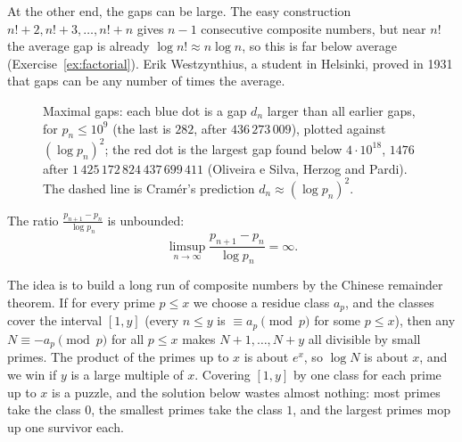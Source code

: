 At the other end, the gaps can be large. The easy construction $n!+2,n!+3,\dots,n!+n$ gives $n-1$ consecutive composite numbers, but near
$n!$ the average gap is already $\log n!\approx n\log n$, so this is far below average (Exercise~\ref{ex:factorial}). Erik Westzynthius, a student in
Helsinki, proved in 1931 that gaps can be any number of times the average.

\begin{figure}[ht]
\centering
{}
\caption{Maximal gaps: each blue dot is a gap $d_n$ larger than all earlier gaps, for $p_n\le10^9$ (the last is $282$, after $436\,273\,009$), plotted
against $(\log p_n)^2$; the red dot is the largest gap found below $4\cdot10^{18}$, $1476$ after $1\,425\,172\,824\,437\,699\,411$ (Oliveira e Silva, Herzog
and Pardi). The dashed line is Cram\'er's prediction $d_n\approx(\log p_n)^2$.}
\label{fig:gaps}
\end{figure}

\begin{theorem}[Westzynthius, 1931]\label{thm:westzynthius}
The ratio $\frac{p_{n+1}-p_n}{\log p_n}$ is unbounded:
\[
\limsup_{n\to\infty}\frac{p_{n+1}-p_n}{\log p_n}=\infty.
\]
\end{theorem}

The idea is to build a long run of composite numbers by the Chinese remainder theorem. If for every prime $p\le x$ we choose a residue class $a_p$,
and the classes cover the interval $[1,y]$ (every $n\le y$ is $\equiv a_p\pmod p$ for some $p\le x$), then any $N\equiv-a_p\pmod p$ for all $p\le x$ makes
$N+1,\dots,N+y$ all divisible by small primes. The product of the primes up to $x$ is about $e^x$, so $\log N$ is about $x$, and we win if $y$ is a large
multiple of $x$. Covering $[1,y]$ by one class for each prime up to $x$ is a puzzle, and the solution below wastes almost nothing: most primes
take the class $0$, the smallest primes take the class $1$, and the largest primes mop up one survivor each.

